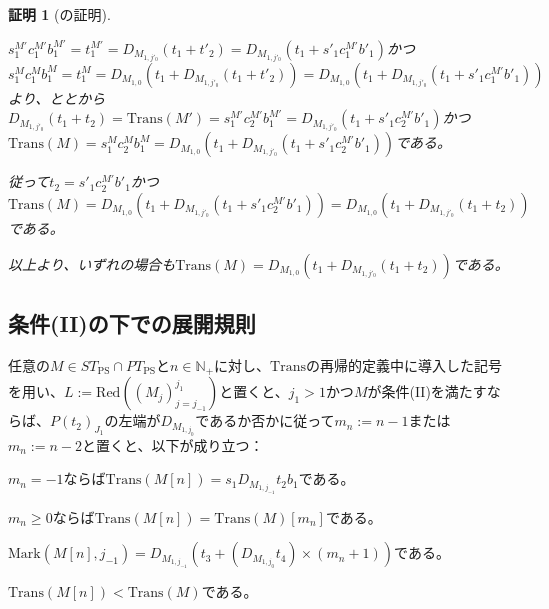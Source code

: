 \documentclass[dvipdfmx,uplatex]{jsarticle}
\theoremstyle{customnonumberbreakfortheorem}
\theoremstyle{customnonumberbreakforproof}
\newtheorem{hideableproof}{証明}
\begin{document}
\begin{hideableproof}[の証明]
\begin{indented}
\begin{indented}
\begin{indented}
				\item \(s_1^{M'} c_1^{M'} b_1^{M'} = t_1^{M'} = D_{M_{1,j'_0}}(t_1 + t'_2) = D_{M_{1,j'_0}}(t_1 + s'_1 c_1^{M'} b'_1)\)かつ\(s_1^M c_1^M b_1^M = t_1^M = D_{M_{1,0}}(t_1 + D_{M_{1,j'_0}}(t_1 + t'_2)) = D_{M_{1,0}}(t_1 + D_{M_{1,j'_0}}(t_1 + s'_1 c_1^{M'} b'_1))\)より、ととから\(D_{M_{1,j'_0}}(t_1 + t_2) = \textrm{Trans}(M') = s_1^{M'} c_2^{M'} b_1^{M'} = D_{M_{1,j'_0}}(t_1 + s'_1 c_2^{M'} b'_1)\)かつ\(\textrm{Trans}(M) = s_1^M c_2^M b_1^M = D_{M_{1,0}}(t_1 + D_{M_{1,j'_0}}(t_1 + s'_1 c_2^{M'} b'_1))\)である。
				\item 従って\(t_2 = s'_1 c_2^{M'} b'_1\)かつ\(\textrm{Trans}(M) = D_{M_{1,0}}(t_1 + D_{M_{1,j'_0}}(t_1 + s'_1 c_2^{M'} b'_1)) = D_{M_{1,0}}(t_1 + D_{M_{1,j'_0}}(t_1 + t_2))\)である。
			\end{indented}
			\item 以上より、いずれの場合も\(\textrm{Trans}(M) = D_{M_{1,0}}(t_1 + D_{M_{1,j'_0}}(t_1 + t_2))\)である。
		\end{indented}
	\end{indented}
\end{hideableproof}


\subsection{条件(II)の下での展開規則}

\begin{proposition}\label{条件(II)の下でのTransと基本列の交換関係}
	任意の\(M \in ST_{\textrm{PS}} \cap PT_{\textrm{PS}}\)と\(n \in \mathbb{N}_{+}\)に対し、\(\textrm{Trans}\)の再帰的定義中に導入した記号を用い、\(L := \textrm{Red}((M_j)_{j=j_{-1}}^{j_1})\)と置くと、\(j_1 > 1\)かつ\(M\)が条件(II)を満たすならば\footnotemark{}、\(P(t_2)_{J_1}\)の左端が\(D_{M_{1,j_0}}\)であるか否かに従って\(m_n := n-1\)または\(m_n := n-2\)と置くと、以下が成り立つ：
	\begin{penumerate}
		\item \(m_n = -1\)ならば\(\textrm{Trans}(M[n]) = s_1 D_{M_{1,j_{-1}}} t_2 b_1\)である。
		\item \(m_n \geq 0\)ならば\(\textrm{Trans}(M[n]) = \textrm{Trans}(M)[m_n]\)である。
		\item \(\textrm{Mark}(M[n],j_{-1}) = D_{M_{1,j_{-1}}} (t_3 + (D_{M_{1,j_0}} t_4) \times (m_n+1))\)である。
		\item \(\textrm{Trans}(M[n]) < \textrm{Trans}(M)\)である。
	\end{penumerate}
\end{proposition}
\end{document}
